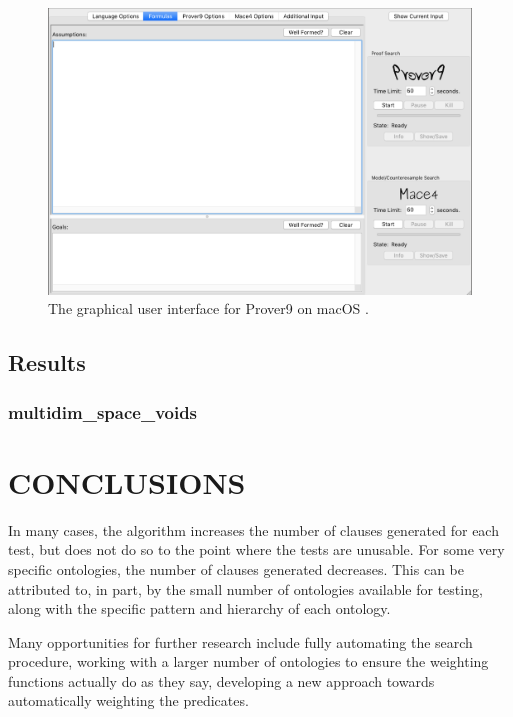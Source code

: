 \documentclass{article}
\begin{document}
\begin{figure}[h]
\centering
\includegraphics[width=6in]{prover9}
\caption{The graphical user interface for Prover9 on macOS \cite{mccune2005prover9}.}
\label{fig:prover9}
\end{figure}



\subsection{{Results}}
\subsubsection{multidim\_space\_voids}



\newpage
\vspace*{.05in}
\section{\MakeUppercase{Conclusions}}

In many cases, the algorithm increases the number of clauses generated for each test, but does not do so to the point where the tests are unusable. For some very specific ontologies, the number of clauses generated decreases. This can be attributed to, in part, by the small number of ontologies available for testing, along with the specific pattern and hierarchy of each ontology. 

Many opportunities for further research include fully automating the search procedure, working with a larger number of ontologies to ensure the weighting functions actually do as they say, developing a new approach towards automatically weighting the predicates. 
\newpage
{}
\vspace*{.05in}
\printbibliography
\end{document}
